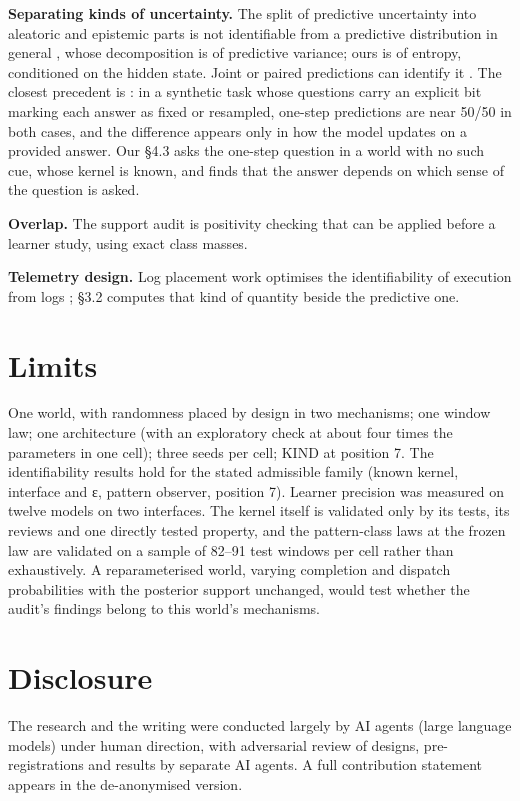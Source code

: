 \documentclass[10pt]{article}
\begin{document}
\textbf{Separating kinds of uncertainty.} The split of predictive uncertainty into aleatoric and epistemic parts is not
identifiable from a predictive distribution in general \citep{bergna2026decoupled}, whose decomposition is of predictive
variance; ours is of entropy, conditioned on the hidden state. Joint or paired predictions can identify it
\citep{osband2021epistemic, johnson2024experts}. The closest precedent is \citet[Section 5.1]{ahdritz2024knowable}: in a synthetic task
whose questions carry an explicit bit marking each answer as fixed or resampled, one-step predictions are near 50/50 in
both cases, and the difference appears only in how the model updates on a provided answer. Our §4.3 asks the one-step
question in a world with no such cue, whose kernel is known, and finds that the answer depends on which sense of the
question is asked.

\textbf{Overlap.} The support audit is positivity checking \citep{petersen2012positivity, damour2017overlap} that can be applied
before a learner study, using exact class masses.

\textbf{Telemetry design.} Log placement work optimises the identifiability of execution from logs \citep{zhao2017log20}; §3.2
computes that kind of quantity beside the predictive one.

\hypertarget{limits}{%
\section{Limits}\label{limits}}

One world, with randomness placed by design in two mechanisms; one window law; one architecture (with an exploratory
check at about four times the parameters in one cell); three seeds per cell; KIND at position 7. The identifiability
results hold for the stated admissible family (known kernel, interface and ε, pattern observer, position 7). Learner
precision was measured on twelve models on two interfaces. The kernel itself is validated only by its tests, its
reviews and one directly tested property, and the pattern-class laws at the frozen law are validated on a sample of
82--91 test windows per cell rather than exhaustively. A reparameterised world, varying completion and dispatch probabilities with
the posterior support unchanged, would test whether the audit's findings belong to this world's mechanisms.

\section*{Disclosure}
The research and the writing were conducted largely by AI agents (large language models) under human direction, with adversarial review of designs, pre-registrations and results by separate AI agents. A full contribution statement appears in the de-anonymised version.
\end{document}
